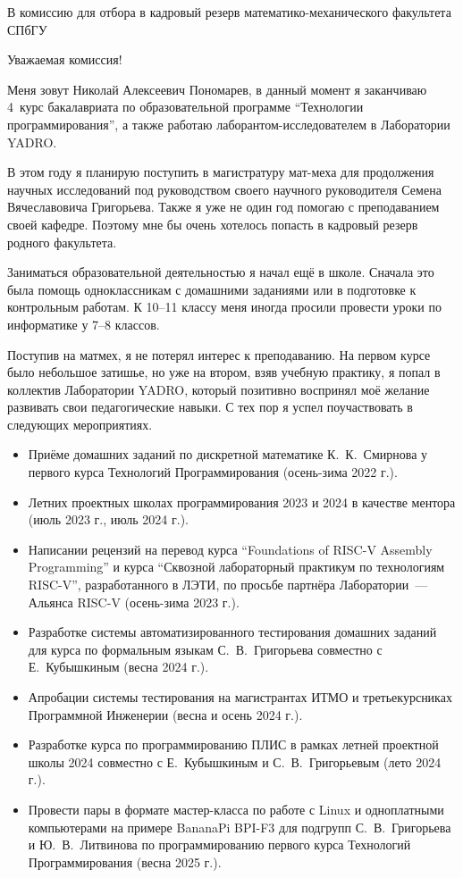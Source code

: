 \documentclass[foldmarks=false, enlargefirstpage=true,
    firstfoot=false, fromphone, fromemail, version=last]{scrlttr2}
\begin{document}
\begin{letter}{В комиссию для отбора в кадровый резерв математико-механического факультета СПбГУ}
    \opening{Уважаемая комиссия!}
    Меня зовут Николай Алексеевич Пономарев, в данный момент я заканчиваю 4~курс бакалавриата по образовательной программе \enquote{Технологии программирования}, а также работаю лаборантом-исследователем в Лаборатории YADRO.

    В этом году я планирую поступить в магистратуру мат-меха для продолжения научных исследований под руководством своего научного руководителя Семена Вячеславовича Григорьева.
    Также я уже не один год помогаю с преподаванием своей кафедре.
    Поэтому мне бы очень хотелось попасть в кадровый резерв родного факультета.

    Заниматься образовательной деятельностью я начал ещё в школе.
    Сначала это была помощь одноклассникам с домашними заданиями или в подготовке к контрольным работам.
    К 10--11 классу меня иногда просили провести уроки по информатике у 7--8 классов.

    Поступив на матмех, я не потерял интерес к преподаванию.
    На первом курсе было небольшое затишье, но уже на втором, взяв учебную практику, я попал в коллектив Лаборатории YADRO, который позитивно воспринял моё желание развивать свои педагогические навыки.
    С тех пор я успел поучаствовать в следующих мероприятиях.
    \begin{itemize}
        \item Приёме домашних заданий по дискретной математике К.~К.~Смирнова у первого курса Технологий Программирования (осень-зима 2022 г.).
        \item Летних проектных школах программирования 2023 и 2024 в качестве ментора (июль 2023 г., июль 2024 г.).
        \item Написании рецензий на перевод курса \enquote{Foundations of RISC-V Assembly Programming} и курса \enquote{Сквозной лабораторный практикум по технологиям RISC-V}, разработанного в ЛЭТИ, по просьбе партнёра Лаборатории~--- Альянса RISC-V (осень-зима 2023 г.).
        \item Разработке системы автоматизированного тестирования домашних заданий для курса по формальным языкам С.~В.~Григорьева совместно с Е.~Кубышкиным (весна 2024 г.).
        \item Апробации системы тестирования на магистрантах ИТМО и третьекурсниках Программной Инженерии (весна и осень 2024 г.).
        \item Разработке курса по программированию ПЛИС в рамках летней проектной школы 2024 совместно с Е.~Кубышкиным и С.~В.~Григорьевым (лето 2024 г.).
        \item Провести пары в формате мастер-класса по работе с Linux и одноплатными компьютерами на примере BananaPi BPI-F3 для подгрупп С.~В.~Григорьева и Ю.~В.~Литвинова по программированию первого курса Технологий Программирования (весна 2025 г.).
    \end{itemize}


\end{letter}
\end{document}
